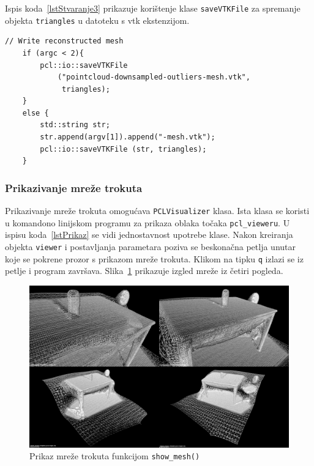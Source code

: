 Ispis koda~\ref{lstStvaranje3} prikazuje korištenje klase
\texttt{saveVTKFile} za spremanje objekta \texttt{triangles} u datoteku
s vtk ekstenzijom.

\begin{lstlisting}[label=lstStvaranje3,caption={Dio izvornog koda iz
funkcije \texttt{reconstruct\_mesh()} }]
    // Write reconstructed mesh
    if (argc < 2){
        pcl::io::saveVTKFile
            ("pointcloud-downsampled-outliers-mesh.vtk",
             triangles);
    }
    else {
        std::string str;
        str.append(argv[1]).append("-mesh.vtk");
        pcl::io::saveVTKFile (str, triangles);
    }
\end{lstlisting}


\subsubsection{Prikazivanje mreže trokuta} %
\label{ssub:Prikazivanje mreže trokuta}
Prikazivanje mreže trokuta omogućava \texttt{PCLVisualizer} klasa. Ista
klasa se koristi u komandono linijskom programu za prikaza oblaka točaka
\texttt{pcl\_vieweru}. U ispisu koda~\ref{lstPrikaz} se vidi
jednostavnost upotrebe klase. Nakon kreiranja objekta \texttt{viewer} i
postavljanja parametara poziva se beskonačna petlja unutar koje se
pokrene prozor s prikazom mreže trokuta. Klikom na tipku \texttt{q}
izlazi se iz petlje i program završava.
Slika~\ref{fig:tablesecne-mesh-perspectives} prikazuje izgled mreže iz
četiri pogleda.

\begin{figure}[h]
\centering
\includegraphics[scale=0.25]{figures/tablescene-mesh-perspectives.png}
\caption{Prikaz mreže trokuta funkcijom \texttt{show\_mesh()} }
\label{fig:tablesecne-mesh-perspectives}
\end{figure}

